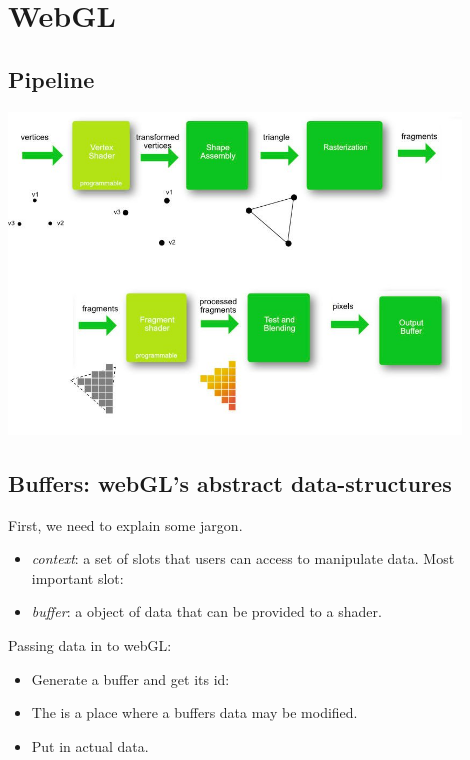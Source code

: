 \section{WebGL}

\subsection{Pipeline}
\includegraphics[width=0.9\textwidth]{images/graphicPipeline.jpg}

\subsection{Buffers: webGL's abstract data-structures}

First, we need to explain some jargon. 
\begin{itemize}
    \item \emph{context}: a set of slots that users can access to manipulate data. Most important slot: 
    \item \emph{buffer}: a object of data that can be provided to a shader.
\end{itemize}

Passing data in to webGL: 
\begin{itemize}
    \item Generate a buffer and get its id: 
    \item The  is a place where a buffers data may be modified. 
    \item Put in actual data. 
\end{itemize}


